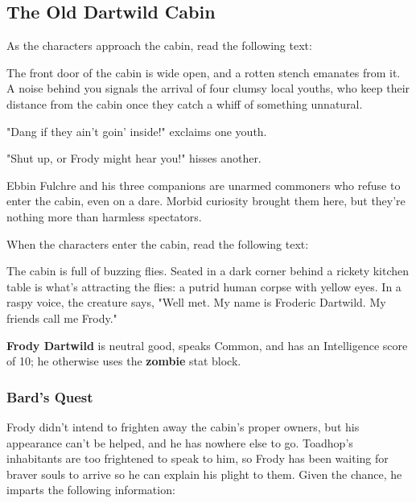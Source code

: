 \documentclass[10pt,a4paper,twoside,bg=print,twocolumn,openany,nodeprecatedcode]{dndbook}
\begin{document}
\subsection{The Old Dartwild Cabin}
As the characters approach the cabin, read the following text:

\begin{DndReadAloud}{}
The front door of the cabin is wide open, and a rotten stench emanates from it. A noise behind you signals the arrival of four clumsy local youths, who keep their distance from the cabin once they catch a whiff of something unnatural.

"Dang if they ain't goin' inside!" exclaims one youth.

"Shut up, or Frody might hear you!" hisses another.

\end{DndReadAloud}

Ebbin Fulchre and his three companions are unarmed commoners who refuse to enter the cabin, even on a dare. Morbid curiosity brought them here, but they're nothing more than harmless spectators.

When the characters enter the cabin, read the following text:

\begin{DndReadAloud}{}
The cabin is full of buzzing flies. Seated in a dark corner behind a rickety kitchen table is what's attracting the flies: a putrid human corpse with yellow eyes. In a raspy voice, the creature says, "Well met. My name is Froderic Dartwild. My friends call me Frody."

\end{DndReadAloud}

\textbf{Frody Dartwild} is neutral good, speaks Common, and has an Intelligence score of 10; he otherwise uses the \textbf{zombie} stat block.

\subsubsection{Bard's Quest}
Frody didn't intend to frighten away the cabin's proper owners, but his appearance can't be helped, and he has nowhere else to go. Toadhop's inhabitants are too frightened to speak to him, so Frody has been waiting for braver souls to arrive so he can explain his plight to them. Given the chance, he imparts the following information:
\end{document}
